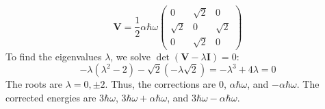 \begin{solution}
\begin{itemize}
\begin{equation*}
        \mathbf{V} = \frac{1}{2} \alpha \hbar\omega \begin{pmatrix} 0 & \sqrt{2} & 0 \\ \sqrt{2} & 0 & \sqrt{2} \\ 0 & \sqrt{2} & 0 \end{pmatrix}
    \end{equation*}
    To find the eigenvalues $\lambda$, we solve $\det(\mathbf{V} - \lambda \mathbf{I}) = 0$:
    \begin{equation*}
        -\lambda (\lambda^2 - 2) - \sqrt{2}(-\lambda\sqrt{2}) = -\lambda^3 + 4\lambda = 0
    \end{equation*}
    The roots are $\lambda = 0, \pm 2$. Thus, the corrections are $0$, $\alpha\hbar\omega$, and $-\alpha\hbar\omega$. The corrected energies are $3\hbar\omega$, $3\hbar\omega + \alpha\hbar\omega$, and $3\hbar\omega - \alpha\hbar\omega$.
\end{itemize}


\end{solution}
